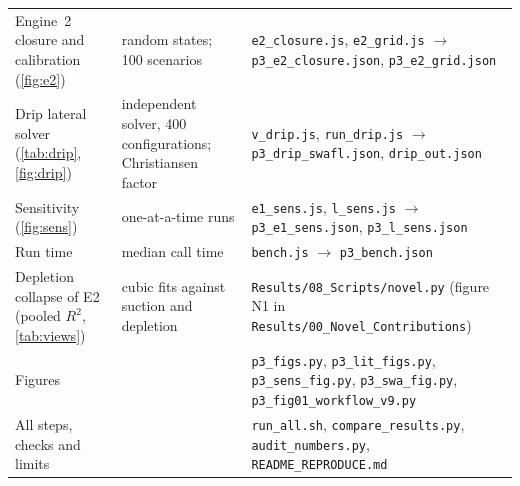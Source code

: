 \documentclass[preprint,12pt]{elsarticle}
\begin{document}
\begin{table}[H]
\begin{tabularx}{\textwidth}{>{\raggedright\arraybackslash}p{4.2cm}>{\raggedright\arraybackslash}p{3.6cm}X}
Engine~2 closure and calibration (\cref{fig:e2}) & 60 random states; 100 scenarios & \texttt{e2\_closure.js}, \texttt{e2\_grid.js} $\to$ \texttt{p3\_e2\_closure.json}, \texttt{p3\_e2\_grid.json}\\
Drip lateral solver (\cref{tab:drip}, \cref{fig:drip}) & independent solver, 400 configurations; Christiansen factor & \texttt{v\_drip.js}, \texttt{run\_drip.js} $\to$ \texttt{p3\_drip\_swafl.json}, \texttt{drip\_out.json}\\
Sensitivity (\cref{fig:sens}) & one-at-a-time runs & \texttt{e1\_sens.js}, \texttt{l\_sens.js} $\to$ \texttt{p3\_e1\_sens.json}, \texttt{p3\_l\_sens.json}\\
Run time & median call time & \texttt{bench.js} $\to$ \texttt{p3\_bench.json}\\
Depletion collapse of E2 (pooled $R^2$, \cref{tab:views}) & cubic fits against suction and depletion & \texttt{Results/08\_Scripts/novel.py} (figure N1 in \texttt{Results/00\_Novel\_Contributions})\\
Figures & & \texttt{p3\_figs.py}, \texttt{p3\_lit\_figs.py}, \texttt{p3\_sens\_fig.py}, \texttt{p3\_swa\_fig.py}, \texttt{p3\_fig01\_workflow\_v9.py}\\
All steps, checks and limits & & \texttt{run\_all.sh}, \texttt{compare\_results.py}, \texttt{audit\_numbers.py}, \texttt{README\_REPRODUCE.md}\\\bottomrule
\end{tabularx}
\end{table}
\end{document}
